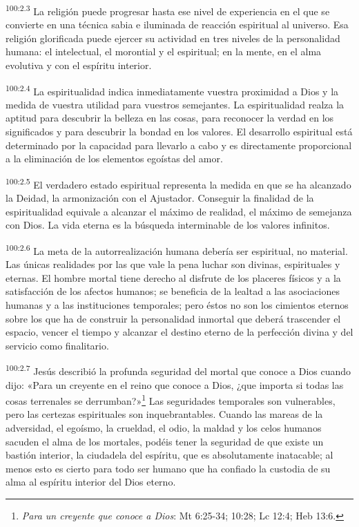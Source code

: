 \par
\textsuperscript{100:2.3} La religión puede progresar hasta ese nivel de experiencia en el que se convierte en una técnica sabia e iluminada de reacción espiritual al universo. Esa religión glorificada puede ejercer su actividad en tres niveles de la personalidad humana: el intelectual, el morontial y el espiritual; en la mente, en el alma evolutiva y con el espíritu interior.

\par
\textsuperscript{100:2.4} La espiritualidad indica inmediatamente vuestra proximidad a Dios y la medida de vuestra utilidad para vuestros semejantes. La espiritualidad realza la aptitud para descubrir la belleza en las cosas, para reconocer la verdad en los significados y para descubrir la bondad en los valores. El desarrollo espiritual está determinado por la capacidad para llevarlo a cabo y es directamente proporcional a la eliminación de los elementos egoístas del amor.

\par
\textsuperscript{100:2.5} El verdadero estado espiritual representa la medida en que se ha alcanzado la Deidad, la armonización con el Ajustador. Conseguir la finalidad de la espiritualidad equivale a alcanzar el máximo de realidad, el máximo de semejanza con Dios. La vida eterna es la búsqueda interminable de los valores infinitos.

\par
\textsuperscript{100:2.6} La meta de la autorrealización humana debería ser espiritual, no material. Las únicas realidades por las que vale la pena luchar son divinas, espirituales y eternas. El hombre mortal tiene derecho al disfrute de los placeres físicos y a la satisfacción de los afectos humanos; se beneficia de la lealtad a las asociaciones humanas y a las instituciones temporales; pero éstos no son los cimientos eternos sobre los que ha de construir la personalidad inmortal que deberá trascender el espacio, vencer el tiempo y alcanzar el destino eterno de la perfección divina y del servicio como finalitario.

\par
\textsuperscript{100:2.7} Jesús describió la profunda seguridad del mortal que conoce a Dios cuando dijo: «Para un creyente en el reino que conoce a Dios, ¿que importa si todas las cosas terrenales se derrumban?»\footnote{\textit{Para un creyente que conoce a Dios}: Mt 6:25-34; 10:28; Lc 12:4; Heb 13:6.} Las seguridades temporales son vulnerables, pero las certezas espirituales son inquebrantables. Cuando las mareas de la adversidad, el egoísmo, la crueldad, el odio, la maldad y los celos humanos sacuden el alma de los mortales, podéis tener la seguridad de que existe un bastión interior, la ciudadela del espíritu, que es absolutamente inatacable; al menos esto es cierto para todo ser humano que ha confiado la custodia de su alma al espíritu interior del Dios eterno.

